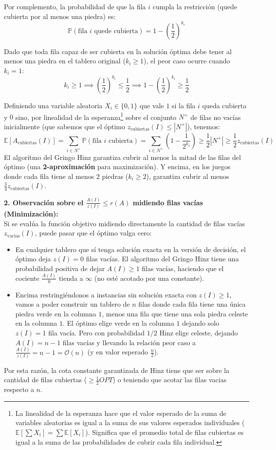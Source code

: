 Por complemento, la probabilidad de que la fila $i$ cumpla la restricción (quede cubierta por al menos una piedra) es:
\[ \mathbb{P}(\text{fila } i \text{ quede cubierta}) = 1 - \left(\frac{1}{2}\right)^{k_i} \]

Dado que toda fila capaz de ser cubierta en la solución óptima debe tener al menos una piedra en el tablero original ($k_i \ge 1$), el peor caso ocurre cuando $k_i = 1$:
\[ k_i \ge 1 \implies \left(\frac{1}{2}\right)^{k_i} \le \frac{1}{2} \implies 1 - \left(\frac{1}{2}\right)^{k_i} \ge \frac{1}{2} \]

Definiendo una variable aleatoria $X_i \in \{0, 1\}$ que vale $1$ si la fila $i$ queda cubierta y $0$ sino, por linealidad de la esperanza\footnote{La linealidad de la esperanza hace que el valor esperado de la suma de variables aleatorias es igual a la suma de sus valores esperados individuales ($\mathbb{E}[\sum X_i] = \sum \mathbb{E}[X_i]$). Significa que el promedio total de filas cubiertas es igual a la suma de las probabilidades de cubrir cada fila individual.} sobre el conjunto $N^+$ de filas no vacías inicialmente (que sabemos que el óptimo $z_{\text{cubiertas}}(I) \le |N^+|$), tenemos:
\[ \mathbb{E}[A_{\text{cubiertas}}(I)] = \sum_{i \in N^+} \mathbb{P}(\text{fila } i \text{ cubierta}) = \sum_{i \in N^+} \left(1 - \frac{1}{2^{k_i}}\right) \ge \frac{1}{2} |N^+| \ge \frac{1}{2} z_{\text{cubiertas}}(I) \]
El algoritmo del Gringo Hinz garantiza cubrir al menos la mitad de las filas del óptimo (una \textbf{2-aproximación} para maximización). Y encima, en los juegos donde cada fila tiene al menos $2$ piedras ($k_i \ge 2$), garantiza cubrir al menos $\frac{3}{4} z_{\text{cubiertas}}(I)$.

\textbf{2. Observación sobre el $\frac{A(I)}{z(I)} \le r(A)$ midiendo filas vacías (Minimización):} \\
Si se evalúa la función objetivo midiendo directamente la cantidad de filas vacías $z_{\text{vacías}}(I)$, puede pasar que el óptimo valga cero:
\begin{itemize}
    \item En cualquier tablero que sí tenga solución exacta en la versión de decisión, el óptimo deja $z(I) = 0$ filas vacías. El algoritmo del Gringo Hinz tiene una probabilidad positiva de dejar $A(I) \ge 1$ filas vacías, haciendo que el cociente $\frac{A(I)}{0}$ tienda a $\infty$ (no esté acotado por una constante).
    \item Encima restringiéndonos a instancias sin solución exacta con $z(I) \ge 1$, vamos a poder construir un tablero de $n$ filas donde cada fila tiene una única piedra verde en la columna $1$, menos una fila que tiene una sola piedra celeste en la columna $1$. El óptimo elige verde en la columna $1$ dejando solo $z(I) = 1$ fila vacía. Pero con probabilidad $1/2$ Hinz elige celeste, dejando $A(I) = n - 1$ filas vacías y llevando la relación peor caso a $\frac{A(I)}{z(I)} = n - 1 = \mathcal{O}(n)$ (y en valor esperado $\frac{n}{2}$).
\end{itemize}
Por esta razón, la cota constante garantizada de Hinz tiene que ser sobre la cantidad de filas cubiertas ($\ge \frac{1}{2} OPT$) o teniendo que acotar las filas vacias respecto a $n$.

